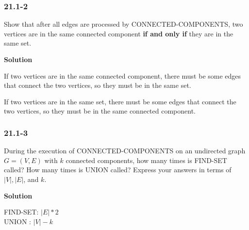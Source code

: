 \subsubsection {21.1-2}

Show that after all edges are processed by CONNECTED-COMPONENTS, two vertices
are in the same connected component \textbf{if and only if} they are in the same
set.

\textbf{Solution}

If two vertices are in the same connected component, there must be some edges
that connect the two vertices, so they must be in the same set.

If two vertices are in the same set, there must be some edges that connect the
two vertices, so they must be in the same connected component.

\subsubsection {21.1-3}

During the execution of CONNECTED-COMPONENTS on an undirected graph $G = (V, E)$
with $k$ connected components, how many times is FIND-SET called? How many times
is UNION called? Express your answers in terms of $|V|, |E|$, and $k$.

\textbf{Solution}

FIND-SET: $|E| * 2$\\
UNION   : $|V| - k$
